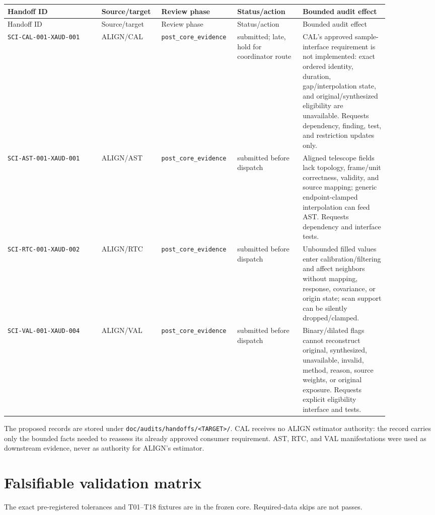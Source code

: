\documentclass[11pt]{article}
\newcommand{\code}[1]{\nolinkurl{#1}}
\begin{document}
\begin{longtable}{L{0.235\linewidth}L{0.13\linewidth}L{0.14\linewidth}L{0.16\linewidth}L{0.215\linewidth}}
\toprule
Handoff ID & Source/target & Review phase & Status/action & Bounded audit effect\\
\midrule
\endfirsthead
\toprule
Handoff ID & Source/target & Review phase & Status/action & Bounded audit effect\\
\midrule
\endhead
\code{SCI-CAL-001-XAUD-001} & ALIGN/CAL & \code{post_core_evidence} & submitted; late, hold for coordinator route & CAL's approved sample-interface requirement is not implemented: exact ordered identity, duration, gap/interpolation state, and original/synthesized eligibility are unavailable.  Requests dependency, finding, test, and restriction updates only.\\
\code{SCI-AST-001-XAUD-001} & ALIGN/AST & \code{post_core_evidence} & submitted before dispatch & Aligned telescope fields lack topology, frame/unit correctness, validity, and source mapping; generic endpoint-clamped interpolation can feed AST.  Requests dependency and interface tests.\\
\code{SCI-RTC-001-XAUD-002} & ALIGN/RTC & \code{post_core_evidence} & submitted before dispatch & Unbounded filled values enter calibration/filtering and affect neighbors without mapping, response, covariance, or origin state; scan support can be silently dropped/clamped.\\
\code{SCI-VAL-001-XAUD-004} & ALIGN/VAL & \code{post_core_evidence} & submitted before dispatch & Binary/dilated flags cannot reconstruct original, synthesized, unavailable, invalid, method, reason, source weights, or original exposure.  Requests explicit eligibility interface and tests.\\
\bottomrule
\end{longtable}

The proposed records are stored under
\code{doc/audits/handoffs/<TARGET>/}.  CAL receives no ALIGN estimator
authority: the record carries only the bounded facts needed to reassess its
already approved consumer requirement.  AST, RTC, and VAL manifestations were
used as downstream evidence, never as authority for ALIGN's estimator.

\section{Falsifiable validation matrix}

The exact pre-registered tolerances and T01--T18 fixtures are in the frozen
core.  Required-data skips are not passes.
\end{document}
